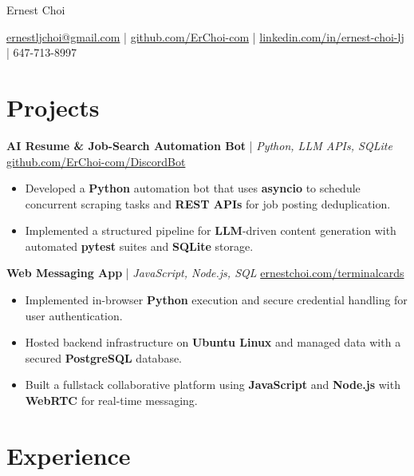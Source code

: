\documentclass[11pt]{article}
\begin{document}
\centerline{\Huge Ernest Choi}
\vspace{3pt}

\centerline{%
  \href{mailto:ernestljchoi@gmail.com}{ernestljchoi@gmail.com} |
  \href{https://www.github.com/ErChoi-com}{github.com/ErChoi-com} |
  \href{https://www.linkedin.com/in/ernest-choi-lj}{linkedin.com/in/ernest-choi-lj} |
  647-713-8997
}


\section*{Projects}

\textbf{AI Resume \& Job-Search Automation Bot} | \textit{Python, LLM APIs, SQLite} \hfill \href{https://github.com/ErChoi-com/DiscordBot}{github.com/ErChoi-com/DiscordBot} \\
\begin{itemize}
  \item Developed a \textbf{Python} automation bot that uses \textbf{asyncio} to schedule concurrent scraping tasks and \textbf{REST APIs} for job posting deduplication.
  \item Implemented a structured pipeline for \textbf{LLM}-driven content generation with automated \textbf{pytest} suites and \textbf{SQLite} storage.
\end{itemize}

\textbf{Web Messaging App} | \textit{JavaScript, Node.js, SQL} \hfill \href{https://www.ernestchoi.com/terminalcards/roomEnter.html}{ernestchoi.com/terminalcards} \\
\begin{itemize}
  \item Implemented in-browser \textbf{Python} execution and secure credential handling for user authentication.
  \item Hosted backend infrastructure on \textbf{Ubuntu Linux} and managed data with a secured \textbf{PostgreSQL} database.
  \item Built a fullstack collaborative platform using \textbf{JavaScript} and \textbf{Node.js} with \textbf{WebRTC} for real-time messaging.
\end{itemize}

\section*{Experience}
\end{document}
